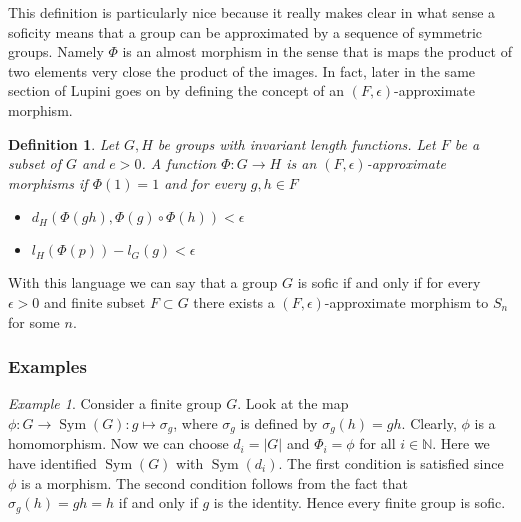 \documentclass[titlepage, a4paper]{article}
\newcommand{\N}{\mathbb{N}}
\newcommand{\card}[1]{\left| #1 \right|}
\DeclareMathOperator{\sym}{Sym}
\newtheorem{definition}{Definition}
\theoremstyle{remark}
\newtheorem{example}{Example}
\begin{document}
	This definition is particularly nice because it really makes clear in what sense a soficity means that a group can be approximated by a sequence of symmetric groups. 
	Namely $\Phi$ is an almost morphism in the sense that is maps the product of two elements very close the product of the images. In fact, later in the same section of \cite{capraro_lupini_2015} Lupini goes on by defining the concept of an $(F, \epsilon)$-approximate morphism. 
	\begin{definition}
		Let $G, H$ be groups with invariant length functions. 
		Let $F$ be a subset of $G$ and  $e > 0$.  
		A function $\Phi:  G \to H$ is an $(F,\epsilon)$-approximate morphisms if $\Phi(1) = 1$ and for every $g, h \in F$ 
		\begin{itemize}
			\item $d_H(\Phi(gh),\Phi(g)\circ \Phi(h)) < \epsilon$
			\item $l_H(\Phi(p)) - l_G(g) < \epsilon$
		\end{itemize}
	\end{definition}
	With this language we can say that a group $G$ is sofic if and only if for every $\epsilon >0$ and finite subset $F \subset G$ there exists a $(F,\epsilon)$-approximate morphism to $S_n$ for some  $n$.


	\subsubsection{Examples}
    \begin{example}\label{ex:finite_group_sofic}
    Consider a finite group $G$. Look at the map $\phi: G \to \sym(G): g \mapsto \sigma_g$, where $\sigma_g$ is defined by $\sigma_g(h) = gh$. Clearly, $\phi$ is a homomorphism. Now we can choose $d_i = \card G$ and $\Phi_i = \phi$ for all $i \in \N$. Here we have identified $\sym(G)$ with $\sym(d_i)$. The first condition is satisfied since $\phi$ is a morphism. The second condition follows from the fact that $\sigma_g(h) = gh = h$ if and only if $g$ is the identity.
     Hence every finite group is sofic.
    \end{example}

\end{document}
